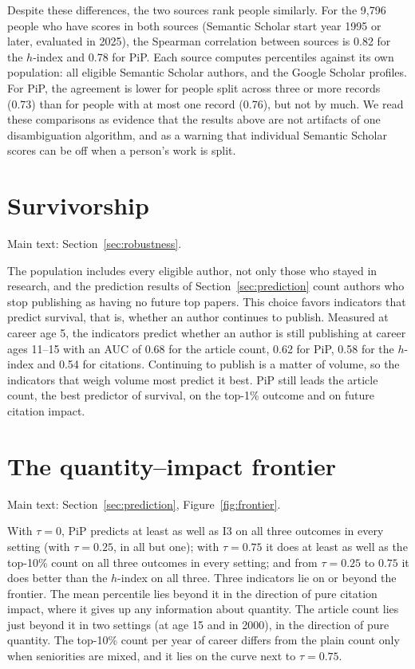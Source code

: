 \documentclass[11pt]{article}
\begin{document}
Despite these differences, the two sources rank people similarly. For the 9,796 people who have scores in both sources
(Semantic Scholar start year 1995 or later, evaluated in 2025), the Spearman correlation between sources is 0.82 for the
$h$-index and 0.78 for PiP. Each source computes percentiles against its own population: all eligible Semantic Scholar
authors, and the Google Scholar profiles. For PiP, the agreement is lower for people split across three or more records
(0.73) than for people with at most one record (0.76), but not by much. We read these comparisons as evidence that the
results above are not artifacts of one disambiguation algorithm, and as a warning that individual Semantic Scholar
scores can be off when a person's work is split.

\section{Survivorship}
\label{supp:surv}
\noindent Main text: Section~\ref{sec:robustness}.\par\nopagebreak

The population includes every eligible author, not only those who stayed in research, and
the prediction results of Section~\ref{sec:prediction} count authors who stop publishing as having no future top
papers. This choice favors indicators that predict survival, that is, whether an author continues to publish. Measured
at career age 5, the indicators predict whether an author is still publishing at career ages 11--15 with an AUC of
0.68 for the article count, 0.62 for PiP, 0.58 for the $h$-index and 0.54 for citations. Continuing to publish is a
matter of volume, so the indicators that weigh volume most predict it best. PiP still leads the article count, the
best predictor of survival, on the top-1\% outcome and on future citation impact.

\section{The quantity--impact frontier}
\label{supp:frontier}
\noindent Main text: Section~\ref{sec:prediction}, Figure~\ref{fig:frontier}.\par\nopagebreak

With $\tau = 0$, PiP predicts at least as well as I3 on all three outcomes in every
setting (with $\tau = 0.25$, in all but one); with $\tau = 0.75$ it does at least as well as the top-10\% count on all
three outcomes in every setting; and from $\tau = 0.25$ to $0.75$ it does better than the $h$-index on all three. Three
indicators lie on or beyond the frontier. The mean percentile lies beyond it in the direction of pure citation impact,
where it gives up any information about quantity. The article count lies just beyond it in two settings (at age 15 and
in 2000), in the direction of pure quantity. The top-10\% count per year of career differs from the plain count only
when seniorities are mixed, and it lies on the curve next to $\tau = 0.75$.
\end{document}
